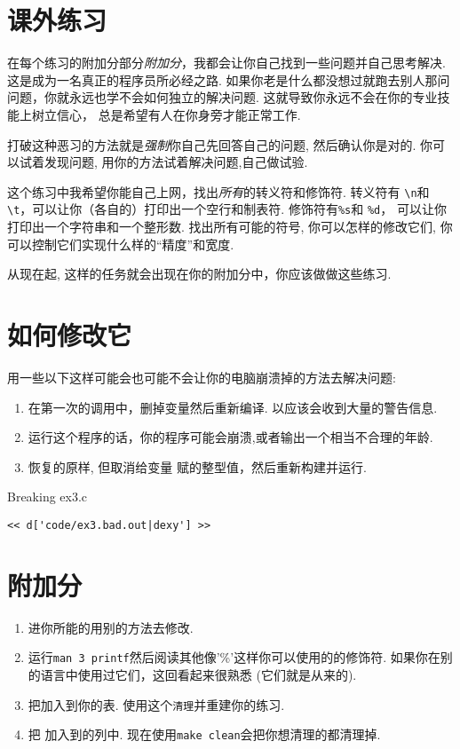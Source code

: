 \section{课外练习}

在每个练习的附加分部分\emph{附加分}，我都会让你自己找到一些问题并自己思考解决. 这是成为一名真正的程序员所必经之路.  如果你老是什么都没想过就跑去别人那问问题，你就永远也学不会如何独立的解决问题. 这就导致你永远不会在你的专业技能上树立信心， 总是希望有人在你身旁才能正常工作.

打破这种恶习的方法就是\emph{强制}你自己先回答自己的问题, 然后确认你是对的. 你可以试着发现问题, 用你的方法试着解决问题,自己做试验.

这个练习中我希望你能自己上网，找出\emph{所有}的转义符和修饰符. 转义符有
\verb|\n|和 \verb|\t|，可以让你（各自的）打印出一个空行和制表符. 修饰符有\verb|%s|和 \verb|%d|， 可以让你打印出一个字符串和一个整形数.  找出所有可能的符号, 你可以怎样的修改它们, 你可以控制它们实现什么样的“精度”和宽度.

从现在起, 这样的任务就会出现在你的附加分中，你应该做做这些练习.

\section{如何修改它}

用一些以下这样可能会也可能不会让你的电脑崩溃掉的方法去解决问题:

\begin{enumerate}
\item 在第一次的调用中，删掉变量然后重新编译. 以应该会收到大量的警告信息.
\item 运行这个程序的话，你的程序可能会崩溃,或者输出一个相当不合理的年龄.
\item 恢复的原样, 但取消给变量
    赋的整型值，然后重新构建并运行.
\end{enumerate}


\begin{Terminal}{Breaking ex3.c}
\begin{lstlisting}
<< d['code/ex3.bad.out|dexy'] >>
\end{lstlisting}
\end{Terminal}

\section{附加分}

\begin{enumerate}
\item 进你所能的用别的方法去修改.
\item 运行\verb|man 3 printf|然后阅读其他像'\%'这样你可以使用的的修饰符. 如果你在别的语言中使用过它们，这回看起来很熟悉 (它们就是从来的).
\item 把加入到你的表. 使用这个\verb|清理|并重建你的练习.
\item 把 加入到的列中.
    现在使用\verb|make clean|会把你想清理的都清理掉.
\end{enumerate}


